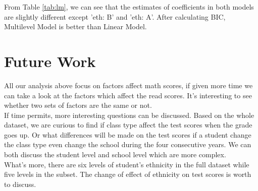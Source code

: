 \documentclass{article}
\begin{document}
From Table \ref{tab:lm}, we can see that the estimates of coefficients in both models are slightly different except 
'eth: B' and 'eth: A'. After calculating BIC, Multilevel Model is better than Linear Model.

\section{Future Work}

All our analysis above focus on factors affect math scores, if given more time we can take a look at the factors which affect the 
read scores. It’s interesting to see whether two sets of factors are the same or not.\\

If time permits, more interesting questions can be discussed. Based on the whole dataset, we are curious to find if class type 
affect the test scores when the grade goes up. Or what differences will be made on the test scores if a student change the class 
type even change the school during the four consecutive years. We can both discuss the student level and school level which are 
more complex.\\

What’s more, there are six levels of student’s ethnicity in the full dataset while five levels in the subset. The change of 
effect of ethnicity on test scores is worth to discuss.
\end{document}
